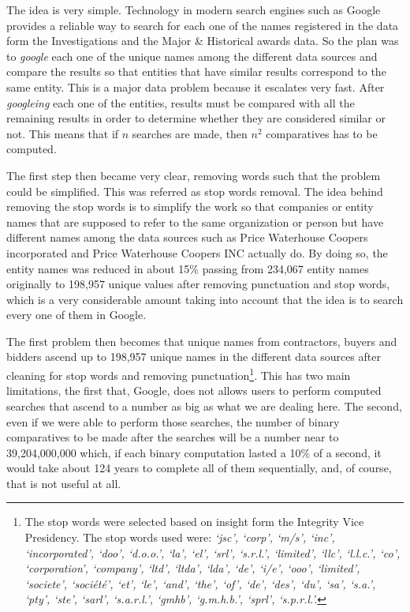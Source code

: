 The idea is very simple. Technology in modern search engines such as Google provides a reliable way to search for each one of the names registered in the data form the Investigations and the Major \& Historical awards data. So the plan was to \textit{google} each one of the unique names among the different data sources and compare the results so that entities that have similar results correspond to the same entity. This is a major data problem because it escalates very fast. After \textit{googleing} each one of the entities, results must be compared with all the remaining results in order to determine whether they are considered similar or not.  This means that if $n$ searches are made, then $n^2$ comparatives has to be computed. 

The first step then became very clear, removing words such that the problem could be simplified. This was referred as stop words removal. The idea behind removing the stop words is to simplify the work so that companies or entity names that are supposed to refer to the same organization or person but have different names among the data sources such as Price Waterhouse Coopers incorporated and Price Waterhouse Coopers INC actually do. By doing so, the entity names was reduced in about 15\% passing from 234,067 entity names originally to 198,957 unique values after removing punctuation and stop words, which is a very considerable amount taking into account that the idea is to search every one of them in Google.

The first problem then becomes that unique names from contractors, buyers and bidders ascend up to 198,957 unique names in the different data sources after cleaning for stop words and removing punctuation\footnote{The stop words were selected based on insight form the Integrity Vice Presidency. The stop words used were: \textit{`jsc', `corp', `m/s', `inc', `incorporated', `doo', `d.o.o.', `la', `el', `srl', `s.r.l.', `limited', `llc', `l.l.c.', `co', `corporation', `company', `ltd', `ltda', `lda', `de', `i/e', `ooo', `limited', `societe', `société', `et', `le', `and', `the', `of', `de', `des', `du', `sa', `s.a.', `pty', `ste', `sarl', `s.a.r.l.', `gmhb', `g.m.h.b.', `sprl', `s.p.r.l.'.} }. This has two main limitations, the first that, Google, does not allows users to perform computed searches that ascend to a number as big as what we are dealing here. The second, even if we were able to perform those searches, the number of binary comparatives to be made after the searches will be a number near to 39,204,000,000 which, if each binary computation lasted a 10\% of a second, it would take about 124 years to complete all of them sequentially, and,  of course, that is not useful at all.

